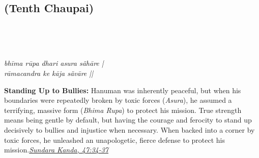 
\newpage

\subsection*{ (Tenth Chaupai)}

\begin{minipage}[t]{0.55\textwidth}
\vspace{0pt}

{\large \linespread{1.5}\selectfont
{}\\
\par}

\vspace{0.5em}

{\large \linespread{1.5}\selectfont
{}\\
\par}

\vspace{0.5em}

{\large \linespread{1.3}\selectfont
\textit{bhīma rūpa dhari asura sãhāre |}\\
\textit{rāmacandra ke kāja sãvāre ||}
\par}
\end{minipage}%
\hfill
\begin{minipage}[t]{0.42\textwidth}
\vspace{0pt}
\begin{tcolorbox}[anchorbox]
\textbf{Standing Up to Bullies:} Hanuman was inherently peaceful, but when his boundaries were repeatedly broken by toxic forces (\textit{Asura}), he assumed a terrifying, massive form (\textit{Bhima Rupa}) to protect his mission. True strength means being gentle by default, but having the courage and ferocity to stand up decisively to bullies and injustice when necessary.
\vspace{0.5em}\newline When backed into a corner by toxic forces, he unleashed an unapologetic, fierce defense to protect his mission.\newline\null\hfill\href{https://www.valmiki.iitk.ac.in/sloka?field_kanda_tid=5&language=dv&field_sarga_value=47}{\textit{Sundara Kanda, 47:34-37}}
\end{tcolorbox}
\vspace{0.5em}

\end{minipage}

